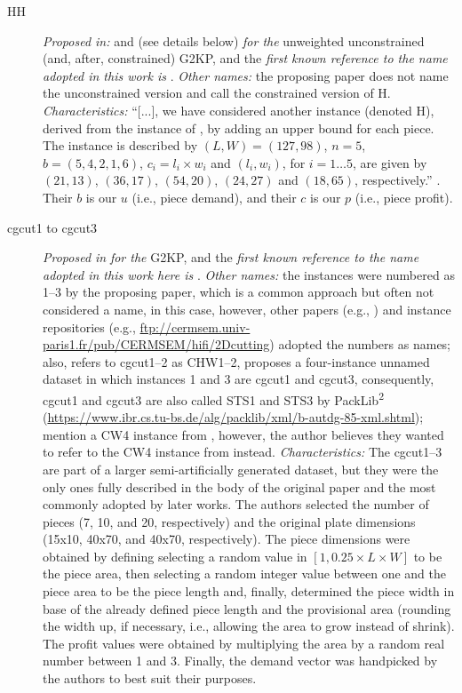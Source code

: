 \documentclass[ppgc,tese,english,formais,babel]{iiufrgs}
\begin{document}
\begin{description}
\item [HH] \emph{Proposed in:} \citet{herz:1972} and \citet{hifi:1997} (see details below) \emph{for the} unweighted unconstrained (and, after, constrained) G2KP, and the \emph{first known reference to the name adopted in this work is} \citet{cung:2000}. \emph{Other names:} the proposing paper does not name the unconstrained version and \citet{hifi:1997} call the constrained version of H. \emph{Characteristics: } ``[...], we have considered another instance (denoted H), derived from the instance of \citet{herz:1972}, by adding an upper bound for each piece. The instance is described by \((L, W) = (127, 98)\), \(n = 5\), \(b = (5, 4, 2, 1, 6)\), \(c_i = l_i \times w_i\) and \((l_i, w_i)\), for \(i = 1 \dots 5\), are given by \((21, 13)\), \((36, 17)\), \((54, 20)\), \((24, 27)\) and \((18, 65)\), respectively.'' \citep{hifi:1997}. Their \(b\) is our \(u\) (i.e., piece demand), and their \(c\) is our \(p\) (i.e., piece profit).
\item [cgcut1 to cgcut3] \emph{Proposed in} \citet{cw:1977} \emph{for the} G2KP, and the \emph{first known reference to the name adopted in this work here is} \citet{martello:1998}. \emph{Other names:} the instances were numbered as 1--3 by the proposing paper, which is a common approach but often not considered a name, in this case, however, other papers (e.g., \citet{hifi:1997}) and instance repositories (e.g., \url{ftp://cermsem.univ-paris1.fr/pub/CERMSEM/hifi/2Dcutting}) adopted the numbers as names; also, \citet{fayard:1998} refers to cgcut1--2 as CHW1--2, \citet{tschoke:1995} proposes a four-instance unnamed dataset in which instances 1 and 3 are cgcut1 and cgcut3, consequently, cgcut1 and cgcut3 are also called STS1 and STS3 by PackLib\textsuperscript{2} (\url{https://www.ibr.cs.tu-bs.de/alg/packlib/xml/b-autdg-85-xml.shtml}); \citet{velasco:2019} mention a CW4 instance from \citet{cw:1977}, however, the author believes they wanted to refer to the CW4 instance from \citet{fayard:1998} instead. \emph{Characteristics:} The cgcut1--3 are part of a larger semi-artificially generated dataset, but they were the only ones fully described in the body of the original paper and the most commonly adopted by later works. The authors selected the number of pieces (7, 10, and 20, respectively) and the original plate dimensions (15x10, 40x70, and 40x70, respectively). The piece dimensions were obtained by defining selecting a random value in \([1, 0.25\times L \times W]\) to be the piece area, then selecting a random integer value between one and the piece area to be the piece length and, finally, determined the piece width in base of the already defined piece length and the provisional area (rounding the width up, if necessary, i.e., allowing the area to grow instead of shrink). The profit values were obtained by multiplying the area by a random real number between 1 and 3. Finally, the demand vector was handpicked by the authors to best suit their purposes.

\end{description}
\end{document}
